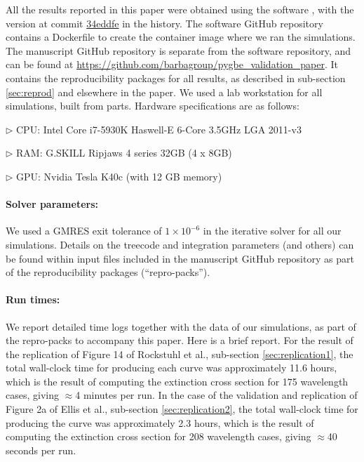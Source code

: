 All the results reported in this paper were obtained using the \pygbe software \cite{ClementiETal2017},
with the version at commit \href{https://github.com/pygbe/pygbe/tree/e1f3650b0c99cab99dcfe5372200d3a1534eddfe}{34eddfe} in the history.
The software GitHub repository contains a Dockerfile to create the container image where we ran the simulations. 
The manuscript GitHub repository is separate from the software repository, and can be found at \url{https://github.com/barbagroup/pygbe_validation_paper}.
It contains the reproducibility packages for all results, as described in sub-section \ref{sec:reprod} and elsewhere in the paper.
We used a lab workstation for all simulations, built from parts.
Hardware specifications are as follows: 
\begin{compactitem}
  \item[$\triangleright$] CPU: Intel Core i7-5930K Haswell-E 6-Core 3.5GHz LGA 2011-v3
  \item[$\triangleright$] RAM: G.SKILL Ripjaws 4 series 32GB (4 x 8GB)
  \item[$\triangleright$] GPU: Nvidia Tesla K40c (with 12 GB memory)
\end{compactitem}

\paragraph{Solver parameters:} We used a GMRES exit tolerance of $1\times10^{-6}$ in the iterative solver for all our simulations. Details on the treecode and integration parameters (and others)
can be found within input files included in the manuscript GitHub repository as part of the reproducibility packages (``repro-packs'').


\paragraph{Run times:} We report detailed time logs together with the data of our simulations, as part of the repro-packs to accompany this paper. Here is a brief report.
For the result of the replication of Figure 14 of Rockstuhl et al., sub-section \ref{sec:replication1}, the total wall-clock time for producing each curve was approximately 11.6 hours, which is the result of computing
the extinction cross section for 175 wavelength cases, giving $\approx$4 minutes per run. In the case of the validation and replication of Figure 2a of Ellis et al., sub-section \ref{sec:replication2}, 
the total wall-clock time for producing the curve was approximately 2.3 hours, which is the result of computing
the extinction cross section for 208 wavelength cases, giving $\approx$40 seconds per run.


